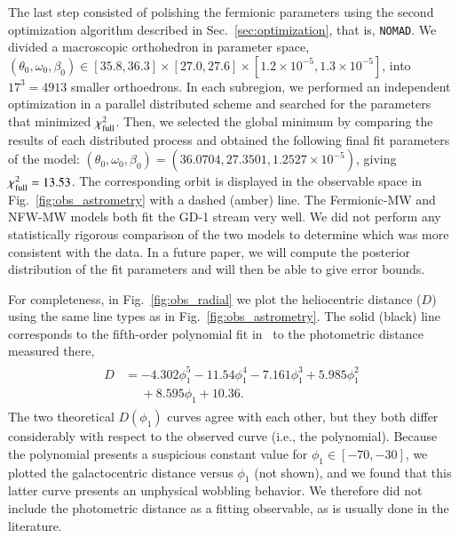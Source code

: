 \documentclass[twocolumn]{aa}
\begin{document}
The last step consisted of polishing the fermionic parameters using the second optimization algorithm described in Sec.~\ref{sec:optimization}, that is, \texttt{NOMAD}. We divided a  macroscopic orthohedron in parameter space, $(\theta_0, \omega_0, \beta_0) \in [35.8, 36.3]\times[27.0, 27.6]\times [1.2\times10^{-5}, 1.3\times10^{-5}]$, into $17^3=4913$ smaller orthoedrons. In each subregion, we performed an independent optimization in a parallel distributed scheme and searched for the parameters that minimized $\chi^2_{\rm{full}}$. Then, we selected the global minimum by comparing the results of each distributed process and obtained the following final fit parameters of the model: $(\theta_0, \omega_0, \beta_0)= (36.0704, 27.3501, 1.2527\times10^{-5})$, giving $\chi^2_{\rm{full}}= 13.53$.
The corresponding orbit is displayed in the observable space in
Fig.~\ref{fig:obs_astrometry} with a dashed (amber) line. The Fermionic-MW and NFW-MW models both fit the GD-1 stream very well.
We did not perform any statistically rigorous comparison of the two models to determine which was more consistent with the data. In a future paper, we will compute the posterior distribution of the fit parameters and will then be able to give error bounds.


For completeness, in Fig.~\ref{fig:obs_radial} we plot the heliocentric distance ($D$) using the same line types as in Fig.~\ref{fig:obs_astrometry}. The solid (black) line corresponds to the fifth-order polynomial fit in~\cite{Ibata_2020} to the photometric distance measured there,
\begin{align}
 \label{phot_dist}
    \begin{split}
        D &= -4.302\phi_1^5 - 11.54\phi_1^4 - 7.161\phi_1^3 + 5.985\phi_1^2\\
      &\phantom{=} + 8.595\phi_1+10.36.
    \end{split}
\end{align}
The two theoretical $D(\phi_1)$ curves agree with each other, but they both differ considerably with respect to the observed curve (i.e., the polynomial). Because the polynomial presents a suspicious constant value for $\phi_1 \in [-70,-30]$, we plotted the galactocentric distance versus $\phi_1$ (not shown), and we found that this latter curve presents an unphysical wobbling behavior. We therefore did not include the photometric distance as a fitting observable, as is usually done in the literature.
\end{document}
